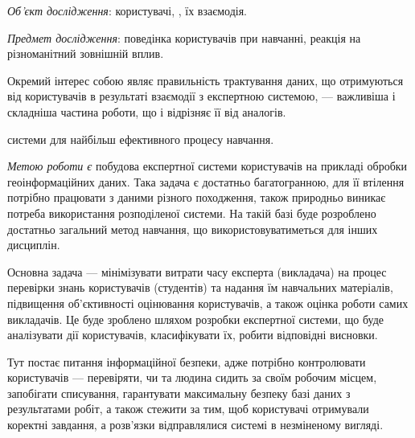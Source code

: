 


\textit{Об’єкт дослідження}:
користувачі, , їх взаємодія.

\textit{Предмет дослідження}:
поведінка користувачів при навчанні, реакція на різноманітний зовнішній вплив.

Окремий інтерес собою являє правильність трактування даних, що отримуються від
користувачів в результаті взаємодії з експертною системою, --- важливіша і
складніша частина роботи, що і відрізняє її від аналогів.

системи для найбільш ефективного процесу навчання.

\textit{Метою роботи є}
побудова експертної системи 
користувачів на прикладі обробки геоінформаційних даних.
Така задача є достатньо багатогранною, для її втілення потрібно працювати
з даними різного походження, також природньо виникає потреба використання
розподіленої системи.
На такій базі буде розроблено достатньо загальний метод навчання,
що використовуватиметься для інших дисциплін.

Основна задача --- мінімізувати витрати часу експерта (викладача) на процес
перевірки знань користувачів (студентів) та надання їм навчальних матеріалів,
підвищення об’єктивності оцінювання користувачів, а також оцінка роботи
самих викладачів.
Це буде зроблено шляхом розробки експертної системи, що буде аналізувати дії
користувачів, класифікувати їх, робити відповідні висновки.

Тут постає питання інформаційної безпеки, адже потрібно контролювати
користувачів --- перевіряти, чи та людина сидить за своїм робочим місцем,
запобігати списування, гарантувати максимальну безпеку базі даних з
результатами робіт, а також стежити за тим, щоб користувачі отримували коректні
завдання, а розв’язки відправлялися системі в незміненому вигляді.

